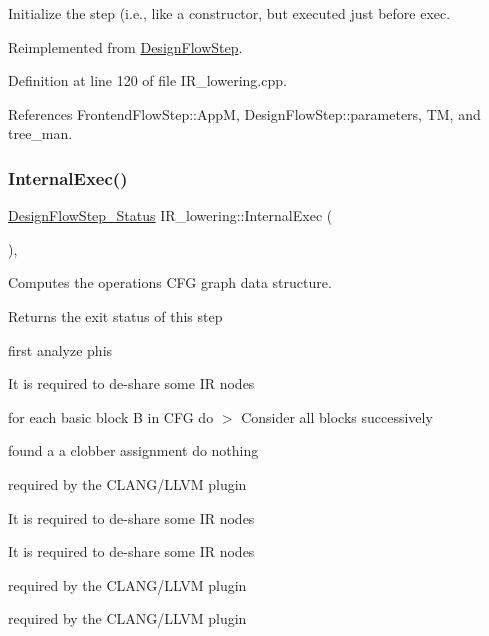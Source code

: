 Initialize the step (i.\+e., like a constructor, but executed just before exec. 



Reimplemented from \hyperlink{classDesignFlowStep_a44b50683382a094976e1d432a7784799}{Design\+Flow\+Step}.



Definition at line 120 of file I\+R\+\_\+lowering.\+cpp.



References Frontend\+Flow\+Step\+::\+AppM, Design\+Flow\+Step\+::parameters, TM, and tree\+\_\+man.

\mbox{\label{classIR__lowering_a96415d3fb04f24946a5fb657db8a8e22}} 
\subsubsection{\texorpdfstring{Internal\+Exec()}{InternalExec()}}
{\footnotesize\ttfamily \hyperlink{design__flow__step_8hpp_afb1f0d73069c26076b8d31dbc8ebecdf}{Design\+Flow\+Step\+\_\+\+Status} I\+R\+\_\+lowering\+::\+Internal\+Exec (\begin{DoxyParamCaption}{ }\end{DoxyParamCaption})\hspace{0.3cm}{\ttfamily [override]}, {\ttfamily [virtual]}}



Computes the operations C\+FG graph data structure. 

\begin{DoxyReturn}{Returns}
the exit status of this step 
\end{DoxyReturn}
first analyze phis

It is required to de-\/share some IR nodes

for each basic block B in C\+FG do $>$ Consider all blocks successively

found a a clobber assignment do nothing

required by the C\+L\+A\+N\+G/\+L\+L\+VM plugin

It is required to de-\/share some IR nodes

It is required to de-\/share some IR nodes

required by the C\+L\+A\+N\+G/\+L\+L\+VM plugin

required by the C\+L\+A\+N\+G/\+L\+L\+VM plugin

